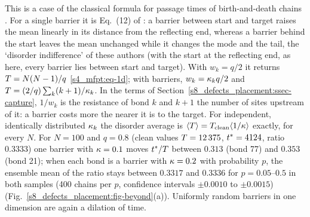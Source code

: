 This is a case of the classical formula for passage times of birth-and-death chains
\citep[see, e.g.,][]{LevinPeresWilmer2009}. For a single barrier it is Eq.~(12) of \citet{SarvaharmanGiuggioli2023}:
a barrier between start and target raises the mean linearly in its distance from the reflecting end, whereas a barrier
behind the start leaves the mean unchanged while it changes the mode and the tail, the `disorder indifference' of
these authors (with the start at the reflecting end, as here, every barrier lies between start and target). With $w_k=q/2$ it returns $T=N(N-1)/q$ \eqref{s4_mfpt:eq-1d}; with
barriers, $w_k=\kappa_kq/2$ and $T=(2/q)\sum_k(k+1)/\kappa_k$. In the terms of
Section~\ref{s8_defects_placement:ssec-capture}, $1/w_k$ is the resistance of bond $k$ and $k+1$ the number of
sites upstream of it: a barrier costs more the nearer it is to the target. For independent, identically
distributed $\kappa_k$ the disorder average is $\langle T\rangle=T_{\mathrm{clean}}\langle1/\kappa\rangle$ exactly, for
every $N$. For $N=100$ and $q=0.8$ (clean values $T=12\,375$, $t^{*}=4124$, ratio $0.3333$) one barrier with
$\kappa=0.1$ moves $t^{*}/T$ between $0.313$ (bond 77) and $0.353$ (bond 21); when each bond is a barrier
with $\kappa=0.2$ with probability $p$, the ensemble mean of the ratio stays between $0.3317$ and $0.3336$ for
$p=0.05$--$0.5$ in both samples (400 chains per $p$, confidence intervals $\pm0.0010$ to $\pm0.0015$)
(Fig.~\ref{s8_defects_placement:fig-beyond}(a)).
Uniformly random barriers in one dimension are again a dilation of time.

